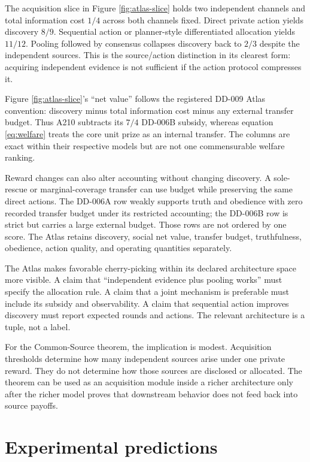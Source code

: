 \documentclass[11pt]{article}
\begin{document}


The acquisition slice in Figure \ref{fig:atlas-slice} holds two independent
channels and total information cost $1/4$ across both channels fixed. Direct
private action yields discovery
$8/9$. Sequential action or planner-style differentiated allocation yields
$11/12$. Pooling followed by consensus collapses discovery back to $2/3$
despite the independent sources. This is the source/action distinction in its
clearest form: acquiring independent evidence is not sufficient if the action
protocol compresses it.

Figure \ref{fig:atlas-slice}'s ``net value'' follows the registered DD-009
Atlas convention: discovery minus total information cost minus any external
transfer budget. Thus A210 subtracts its $7/4$ DD-006B subsidy, whereas
equation \eqref{eq:welfare} treats the core unit prize as an internal transfer.
The columns are exact within their respective models but are not one
commensurable welfare ranking.

Reward changes can also alter accounting without changing discovery. A
sole-rescue or marginal-coverage transfer can use budget while preserving the same
direct actions. The DD-006A row weakly supports truth and obedience with zero
recorded transfer budget under its restricted accounting; the DD-006B row is
strict but carries a large external budget. Those rows are not ordered by one
score. The Atlas retains discovery, social net value, transfer budget,
truthfulness, obedience, action quality, and operating quantities separately.

The Atlas makes favorable cherry-picking within its declared architecture space
more visible. A claim that ``independent evidence plus pooling works'' must
specify the allocation rule. A claim that a
joint mechanism is preferable must include its subsidy and observability. A
claim that sequential action improves discovery must report expected rounds and
actions. The relevant architecture is a tuple, not a label.

For the Common-Source theorem, the implication is modest. Acquisition thresholds
determine how many independent sources arise under one private reward. They do
not determine how those sources are disclosed or allocated. The theorem can be
used as an acquisition module inside a richer architecture only after the richer
model proves that downstream behavior does not feed back into source payoffs.

\section{Experimental predictions}
\end{document}
